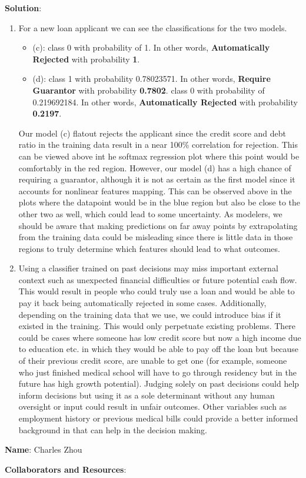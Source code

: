 \documentclass[submit]{../harvardml}
\newenvironment{solution}{
    \vspace{2mm}
    \color{blue}\noindent\textbf{Solution}:
}{}
\begin{document}
\begin{solution}
\begin{enumerate}
\item For a new loan applicant we can see the classifications for the two models.

\begin{itemize}
    \item (c): class 0 with probability of 1. In other words, \textbf{Automatically Rejected} with probability \textbf{1}.

    \item (d): class 1 with probability 0.78023571. In other words, \textbf{Require Guarantor} with probability \textbf{0.7802}. class 0 with probability of 0.219692184. In other words, \textbf{Automatically Rejected} with probability \textbf{0.2197}.
\end{itemize}

Our model (c) flatout rejects the applicant since the credit score and debt ratio in the training data result in a near 100\% correlation for rejection. This can be viewed above int he softmax regression plot where this point would be comfortably in the red region. However, our model (d) has a high chance of requiring a guarantor, although it is not as certain as the first model since it accounts for nonlinear features mapping. This can be observed above in the plots where the datapoint would be in the blue region but also be close to the other two as well, which could lead to some uncertainty. As modelers, we should be aware that making predictions on far away points by extrapolating from the training data could be misleading since there is little data in those regions to truly determine which features should lead to what outcomes.

\item Using a classifier trained on past decisions may miss important external context such as unexpected financial difficulties or future potential cash flow. This would result in people who could truly use a loan and would be able to pay it back being automatically rejected in some cases. Additionally, depending on the training data that we use, we could introduce bias if it existed in the training. This would only perpetuate existing problems. There could be cases where someone has low credit score but now a high income due to education etc. in which they would be able to pay off the loan but because of their previous credit score, are unable to get one (for example, someone who just finished medical school will have to go through residency but in the future has high growth potential). Judging solely on past decisions could help inform decisions but using it as a sole determinant without any human oversight or input could result in unfair outcomes. Other variables such as employment history or previous medical bills could provide a better informed background in that can help in the decision making.



\end{enumerate}

\end{solution}

\newpage
\newpage

\textbf{Name}: Charles Zhou

\textbf{Collaborators and Resources}: 
\end{document}
